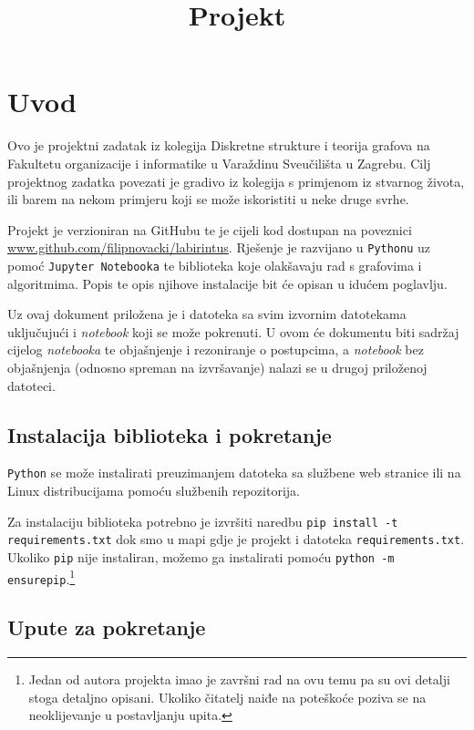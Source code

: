 \documentclass[11pt]{article}
\title{Projekt}
\let\oldsection\section
\renewcommand\section{\clearpage\oldsection}
\begin{document}
	
	\tableofcontents

	\section{Uvod}
	Ovo je projektni zadatak iz kolegija Diskretne strukture i teorija grafova na Fakultetu organizacije i informatike u Varaždinu Sveučilišta u Zagrebu. Cilj projektnog zadatka povezati je gradivo iz kolegija s primjenom iz stvarnog života, ili barem na nekom primjeru koji se može iskoristiti u neke druge svrhe.

	Projekt je verzioniran na GitHubu te je cijeli kod dostupan na poveznici \url{www.github.com/filipnovacki/labirintus}. Rješenje je razvijano u \texttt{Pythonu} uz pomoć \texttt{Jupyter Notebooka} te biblioteka koje olakšavaju rad s grafovima i algoritmima. Popis te opis njihove instalacije bit će opisan u idućem poglavlju.

	Uz ovaj dokument priložena je i datoteka sa svim izvornim datotekama uključujući i \textit{notebook} koji se može pokrenuti. U ovom će dokumentu biti sadržaj cijelog \textit{notebooka} te objašnjenje i rezoniranje o postupcima, a \textit{notebook} bez objašnjenja (odnosno spreman na izvršavanje) nalazi se u drugoj priloženoj datoteci.

	\subsection{Instalacija biblioteka i pokretanje}

	\texttt{Python} se može instalirati preuzimanjem datoteka sa službene web stranice ili na Linux distribucijama pomoću službenih repozitorija.

	Za instalaciju biblioteka potrebno je izvršiti naredbu \texttt{pip
	install -t requirements.txt} dok smo u mapi gdje je projekt i datoteka
	\texttt{requirements.txt}. Ukoliko \texttt{pip} nije instaliran, možemo
	ga instalirati pomoću \texttt{python -m ensurepip}.\footnote{Jedan od
	autora projekta imao je završni rad na ovu temu pa su ovi detalji stoga
	detaljno opisani. Ukoliko čitatelj naiđe na poteškoće poziva se na
	neoklijevanje u postavljanju upita.}

	\subsection{Upute za pokretanje}
\end{document}
